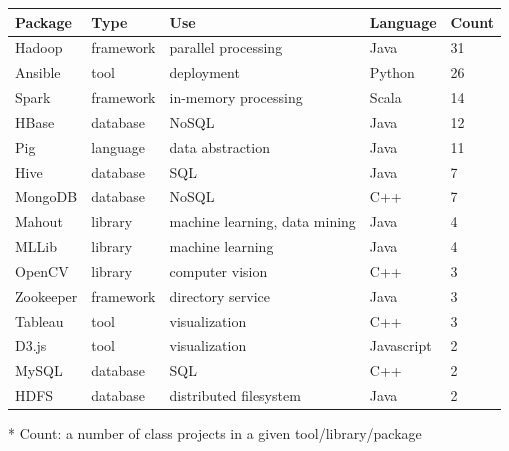 \documentclass[9pt,twocolumn,twoside]{styles/osajnl}
\begin{document}
\begin{table}[htb]
\begin{center}
\begin{small}
\begin{threeparttable}
{\begin{tabular}{l|l|l|l|l}
    Package   & Type      & Use                           & Language   & Count\tnote{*} \\ \hline \hline
    Hadoop    & framework & parallel processing           & Java       & 31             \\ \hline
    Ansible   & tool      & deployment                    & Python     & 26             \\ \hline
    Spark     & framework & in-memory processing          & Scala      & 14             \\ \hline
    HBase     & database  & NoSQL                         & Java       & 12             \\ \hline
    Pig       & language  & data abstraction              & Java       & 11             \\ \hline
    Hive      & database  & SQL                           & Java       & 7              \\ \hline
    MongoDB   & database  & NoSQL                         & C++        & 7              \\ \hline
    Mahout    & library   & machine learning, data mining & Java       & 4              \\ \hline
    MLLib     & library   & machine learning              & Java       & 4              \\ \hline
    OpenCV    & library   & computer vision               & C++        & 3              \\ \hline
    Zookeeper & framework & directory service             & Java       & 3              \\ \hline
    Tableau   & tool      & visualization                 & C++        & 3              \\ \hline
    D3.js     & tool      & visualization                 & Javascript & 2              \\ \hline
    MySQL     & database  & SQL                           & C++        & 2              \\ \hline
    HDFS      & database  & distributed filesystem        & Java       & 2              \\ 

  \end{tabular}}
  \begin{tablenotes}
  \item[*] Count: a number of class projects in a given tool/library/package
  \end{tablenotes}
  \end{threeparttable}
    \end{small}
  \end{center}
\end{table}
\end{document}
